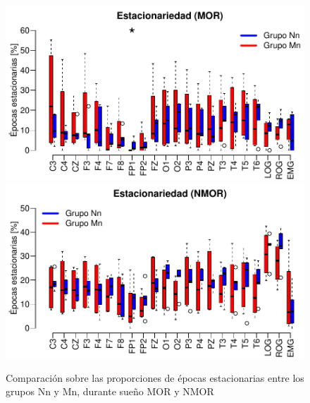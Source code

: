 \begin{figure}
\centering
\includegraphics[width=\linewidth]
{./img_ejemplos/Comparacion_gpos_MOR_v2.pdf} \\
\includegraphics[width=\linewidth]
{./img_ejemplos/Comparacion_gpos_NMOR_v2.pdf}
\caption{Comparación sobre las proporciones de épocas estacionarias entre los grupos Nn y Mn, 
durante sueño MOR y NMOR}
\label{comparacion_graf}
\end{figure}


